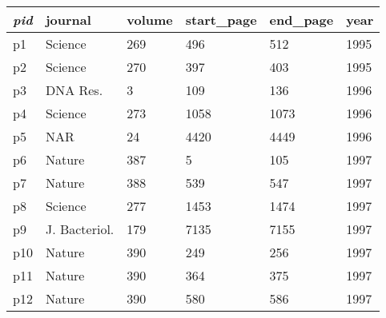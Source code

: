 \begin{tabular}{|l|l|l|l|l|l|}
\hline
 \textit{pid}  &    journal     & volume  & start\_page  & end\_page  & year \\
\hline
 p1   & Science        &    269  &        496  &      512  & 1995\\
 p2   & Science        &    270  &        397  &      403  & 1995\\
 p3   & DNA Res.       &      3  &        109  &      136  & 1996\\
 p4   & Science        &    273  &       1058  &     1073  & 1996\\
 p5   & NAR            &     24  &       4420  &     4449  & 1996\\
 p6   & Nature         &    387  &          5  &      105  & 1997\\
 p7   & Nature         &    388  &        539  &      547  & 1997\\
 p8   & Science        &    277  &       1453  &     1474  & 1997\\
 p9   & J. Bacteriol.  &    179  &       7135  &     7155  & 1997\\
 p10  & Nature         &    390  &        249  &      256  & 1997\\
 p11  & Nature         &    390  &        364  &      375  & 1997\\
 p12  & Nature         &    390  &        580  &      586  & 1997\\
\hline
\end{tabular}
